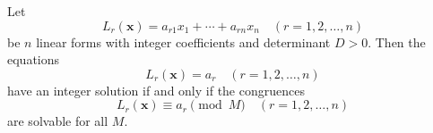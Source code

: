 \begin{proposition}
Let
\[
    L_r(\mathbf{x})=a_{r1}x_1+\cdots+a_{rn}x_n\quad(r=1,2,\ldots,n)
\]
be $n$ linear forms with integer coefficients and determinant $D>0$. Then the equations
\[
    L_r(\mathbf{x})=a_r\quad(r=1,2,\ldots,n)
\]
have an integer solution if and only if the congruences
\[
    L_r(\mathbf{x})\equiv a_r\pmod M\quad(r=1,2,\ldots,n)
\]
are solvable for all $M$.
\end{proposition}
